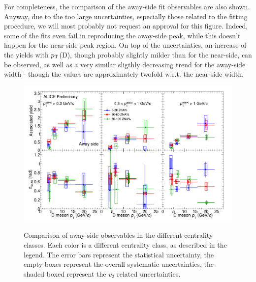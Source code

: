 For completeness, the comparison of the away-side fit observables are also shown. Anyway, due to the too large uncertainties, especially those related to the fitting procedure, we will most probably not request an approval for this figure. Indeed, some of the fits even fail in reproducing the away-side peak, while this doesn't happen for the near-side peak region. On top of the uncertainties, an increase of the yields with $p_{\rm T}$(D), though probably slightly milder than for the near-side, can be observed, as well as a very similar sligthly decreasing trend for the away-side width - though the values are approximately twofold w.r.t. the near-side width.

\begin{landscape}
\begin{figure}
\centering
{\includegraphics[width=0.95\linewidth]{figuresVsCent/Averages/Trends/ComparePPbVsCentFitResults_AwaySide_FinalQM.png}}
 \caption{Comparison of away-side observables in the different centrality classes. Each color is a different centrality class, as described in the legend. The error bars represent the statistical uncertainty, the empty boxes represent the overall systematic uncertainties, the shaded boxed represent the $v_2$ related uncertainties.}
\label{fig:prel3}
\end{figure}
 \end{landscape} 
